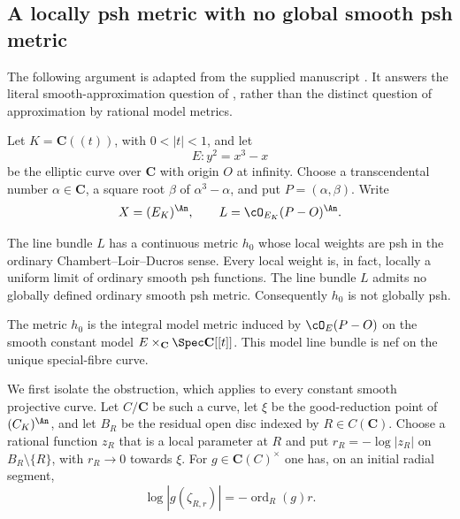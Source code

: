 \subsection{A locally psh metric with no global smooth psh metric}
\label{sec:supplied-p081-global-smooth-counterexample}

The following argument is adapted from the supplied manuscript
\cite{SuppliedP08120260925}.  It answers the literal smooth-approximation
question of \cite[Remark~17.8.10]{CLD25}, rather than the distinct question
of approximation by rational model metrics.

Let $K=\mathbf C((t))$, with $0<|t|<1$, and let
\[
                         E\colon y^2=x^3-x
\]
be the elliptic curve over $\mathbf C$ with origin $O$ at infinity.  Choose
a transcendental number $\alpha\in\mathbf C$, a square root $\beta$ of
$\alpha^3-\alpha$, and put $P=(\alpha,\beta)$.  Write
\[
 X=(E_K)^{\An},\qquad L=\cO_{E_K}(P-O)^{\An}.
\]

\begin{theorem}
\label{thm:supplied-p081-global-smooth-counterexample}
The line bundle $L$ has a continuous metric $h_0$ whose local weights are
psh in the ordinary Chambert--Loir--Ducros sense.  Every local weight is, in
fact, locally a uniform limit of ordinary smooth psh functions.  The line
bundle $L$ admits no globally defined ordinary smooth psh metric.
Consequently $h_0$ is not globally psh.

The metric $h_0$ is the integral model metric induced by
$\cO_E(P-O)$ on the smooth constant model
$E\times_{\mathbf C}\Spec\mathbf C[[t]]$.  This model line bundle is nef on
the unique special-fibre curve.
\end{theorem}

We first isolate the obstruction, which applies to every constant smooth
projective curve.  Let $C/\mathbf C$ be such a curve, let $\xi$ be the
good-reduction point of $(C_K)^{\An}$, and let $B_R$ be the residual open
disc indexed by $R\in C(\mathbf C)$.  Choose a rational function
$z_R$ that is a local parameter at $R$ and put
$r_R=-\log|z_R|$ on $B_R\setminus\{R\}$, with $r_R\to0$ towards $\xi$.
For $g\in\mathbf C(C)^\times$ one has, on an initial radial segment,
\begin{equation}\label{eq:supplied-p081-residual-slope}
             \log|g(\zeta_{R,r})|=-\operatorname{ord}_R(g)r.
\end{equation}

